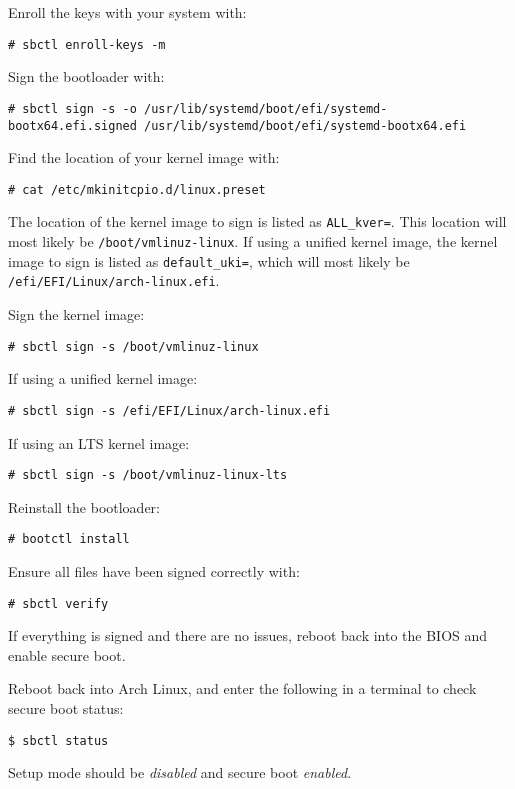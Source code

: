 \documentclass[a4paper]{article}
\begin{document}
Enroll the keys with your system with:
\begin{lstlisting}
# sbctl enroll-keys -m
\end{lstlisting}

Sign the bootloader with:
\begin{lstlisting}
# sbctl sign -s -o /usr/lib/systemd/boot/efi/systemd-bootx64.efi.signed /usr/lib/systemd/boot/efi/systemd-bootx64.efi
\end{lstlisting}

Find the location of your kernel image with:
\begin{lstlisting}
# cat /etc/mkinitcpio.d/linux.preset 
\end{lstlisting}

The location of the kernel image to sign is listed as \lstinline|ALL_kver=|.
This location will most likely be \lstinline|/boot/vmlinuz-linux|.
If using a unified kernel image, the kernel image to sign is listed as \lstinline|default_uki=|, which will most likely be \lstinline|/efi/EFI/Linux/arch-linux.efi|.

Sign the kernel image:
\begin{lstlisting}
# sbctl sign -s /boot/vmlinuz-linux
\end{lstlisting}
If using a unified kernel image:
\begin{lstlisting}
# sbctl sign -s /efi/EFI/Linux/arch-linux.efi
\end{lstlisting}
If using an LTS kernel image:
\begin{lstlisting}
# sbctl sign -s /boot/vmlinuz-linux-lts
\end{lstlisting}

Reinstall the bootloader:
\begin{lstlisting}
# bootctl install
\end{lstlisting}

Ensure all files have been signed correctly with:
\begin{lstlisting}
# sbctl verify
\end{lstlisting}

If everything is signed and there are no issues, reboot back into the BIOS and enable secure boot.

Reboot back into Arch Linux, and enter the following in a terminal to check secure boot status:
\begin{lstlisting}
$ sbctl status
\end{lstlisting}

Setup mode should be \emph{disabled} and secure boot \emph{enabled}.
\end{document}
